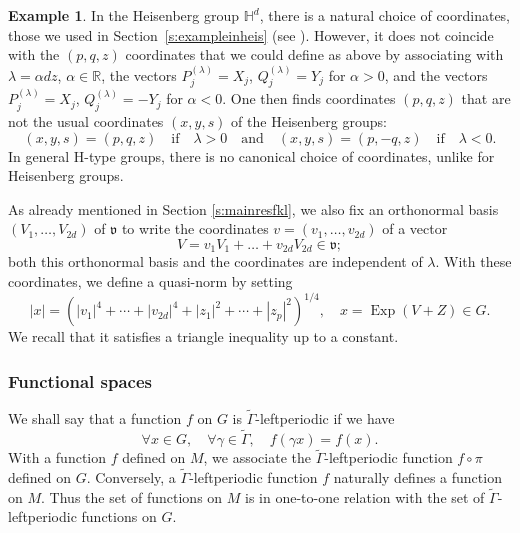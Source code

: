 \documentclass[JEP,XML,SOM,Unicode,published]{cedram}
\DeclareMathOperator{\Exp}{Exp}
\theoremstyle{plain}
\theoremstyle{definition}
\newtheorem{example}[theorem]{Example}
\def\R{{\mathbb R}}
\def\bbH{{\mathbb H}}
\begin{document}
\begin{example}\label{ex:Heisenberg1}
In the Heisenberg group $\bbH^d$, there is a natural choice of coordinates, those we used in Section~\ref{s:exampleinheis} (see \cite[Chap.\,1]{Tay}). However, it does not coincide with the $(p,q,z)$ coordinates that we could define as above by associating with $\lambda=\alpha dz$, $\alpha\in\R$,
the vectors $P_j^{(\lambda)}=X_j$, $Q_j^{(\lambda)}=Y_j$ for $\alpha>0$,
and the vectors $P_j^{(\lambda)}=X_j$, $Q_j^{(\lambda)}=-Y_j$ for $\alpha<0$. One then finds coordinates
$(p,q,z)$ that are not the usual coordinates $(x,y,s)$ of the Heisenberg groups:
\begin{equation}\label{change:var}
(x,y,s)=(p,q,z)\quad \text{if} \quad \lambda>0\quad \text{and} \quad (x,y,s)= (p,-q,z)\quad \text{if} \quad \lambda<0.
\end{equation}
In general H-type groups, there is no canonical choice of coordinates, unlike for Heisenberg groups.
\end{example}

As already mentioned in Section \ref{s:mainresfkl}, we also fix an orthonormal basis $(V_1,\ldots, V_{2d})$ of $\mathfrak v$ to write the coordinates $
v=(v_1,\ldots,v_{2d})$ of a vector
\[
V=v_1V_1 +\ldots + v_{2d} V_{2d}\in \mathfrak v;
\]
both this orthonormal basis and the coordinates are
independent of $\lambda$.
With these coordinates, we define a quasi-norm by setting
\begin{equation}\label{def:quasinorm}
|x|= \left(|v_1|^4 + \cdots +|v_{2d}|^4 + |z_1|^2 + \cdots + |z_p|^2\right)^{1/4},\quad x= \Exp (V+Z)\in G.
\end{equation}
We recall that it satisfies a triangle inequality up to a constant.

\subsubsection{Functional spaces}
We shall say that a function $f$ on $G$ is $\widetilde{\Gamma}$-leftperiodic if we have
\[
\forall x\in G,\quad \forall \gamma\in \widetilde{\Gamma},\quad f(\gamma x)=f(x).
\]
With a function $f$ defined on $M$, we associate the $\widetilde{\Gamma}$-leftperiodic function $f\circ \pi$ defined on $G$. Conversely, a
$\widetilde{\Gamma}$-leftperiodic function $f$ naturally defines a function on $M$. Thus the set of functions on $M$ is in one-to-one relation with the set of $\widetilde{\Gamma}$-leftperiodic functions on $G$.
\end{document}
